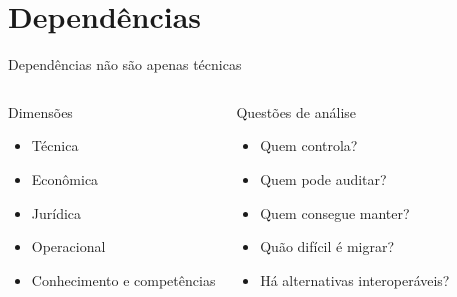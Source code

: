 \section{Dependências}

\begin{frame}{Dependências não são apenas técnicas}
  \begin{columns}[T,onlytextwidth]
      \begin{block}{Dimensões}
        \begin{itemize}
          \item Técnica
          \item Econômica
          \item Jurídica
          \item Operacional
          \item Conhecimento e competências
        \end{itemize}
      \end{block}
      \begin{block}{Questões de análise}
        \begin{itemize}
          \item Quem controla?
          \item Quem pode auditar?
          \item Quem consegue manter?
          \item Quão difícil é migrar?
          \item Há alternativas interoperáveis?
        \end{itemize}
      \end{block}
  \end{columns}
\end{frame}
